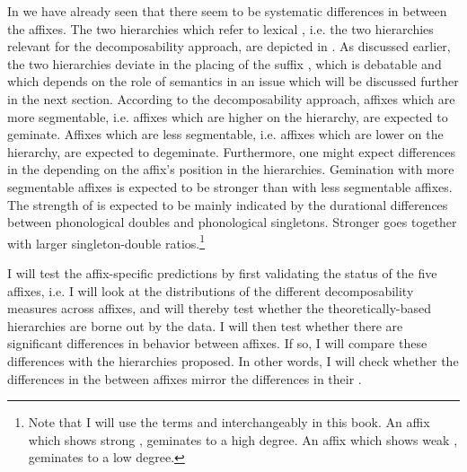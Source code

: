 {{ In  we have already seen that there seem to be systematic differences in  between the affixes. 
The two  hierarchies which refer to lexical , i.e. the two hierarchies relevant for the decomposability approach, are depicted in . As discussed earlier, the two hierarchies deviate in the placing of the suffix , which is debatable and which depends on the role of semantics in  \textendash  an issue which will be discussed further in the next section.
According to the decomposability approach, affixes which are more segmentable, i.e. affixes which are higher on the  hierarchy, are expected to geminate. Affixes which are less segmentable, i.e. affixes which are lower on the hierarchy, are expected to degeminate. Furthermore, one might expect differences in the  depending on the affix's position in the hierarchies. Gemination with more segmentable affixes is expected to be stronger than  with less segmentable affixes. The strength of  is expected to be mainly indicated by the durational differences between phonological doubles and phonological singletons. Stronger  goes together with larger singleton-double ratios.\footnote{Note that I will use the terms  and  interchangeably in this book. An affix which shows strong , geminates to a high degree. An affix which shows weak , geminates to a low degree.}




I will test the affix-specific  predictions by first validating the  status of the five affixes, i.e. I will look at the distributions of the different decomposability measures across affixes, and will thereby test whether the theoretically-based hierarchies are borne out by the data. I will then test whether there are significant differences in  behavior between affixes. If so, I will compare these differences with the  hierarchies proposed. In other words, I will check whether  the differences in the  between affixes mirror the differences in their .

}}
